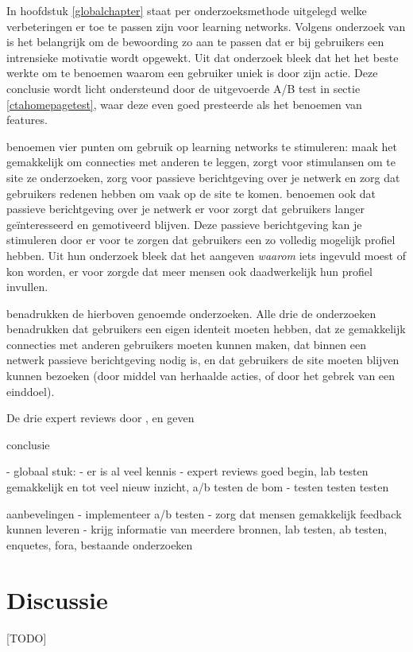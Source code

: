 \documentclass[a4paper, 10pt, pdftex]{report}
\begin{document}
    In hoofdstuk \ref{globalchapter} staat per onderzoeksmethode uitgelegd welke verbeteringen er toe te passen zijn voor learning networks. Volgens onderzoek van \citeauthor{Beenen2004} is het belangrijk om de bewoording zo aan te passen dat er bij gebruikers een intrensieke motivatie wordt opgewekt. Uit dat onderzoek bleek dat het het beste werkte om te benoemen waarom een gebruiker uniek is door zijn actie. Deze conclusie wordt licht ondersteund door de uitgevoerde A/B test in sectie \ref{ctahomepagetest}, waar deze even goed presteerde als het benoemen van features. 
    
    \citeauthor{Sohn2005} benoemen vier punten om gebruik op learning networks te stimuleren: maak het gemakkelijk om connecties met anderen te leggen, zorgt voor stimulansen om te site ze onderzoeken, zorg voor passieve berichtgeving over je netwerk en zorg dat gebruikers redenen hebben om vaak op de site te komen. \citeauthor{Brouns2008} benoemen ook dat passieve berichtgeving over je netwerk er voor zorgt dat gebruikers langer ge\"interesseerd en gemotiveerd blijven. Deze passieve berichtgeving kan je stimuleren door er voor te zorgen dat gebruikers een zo volledig mogelijk profiel hebben. Uit hun onderzoek bleek dat het aangeven \emph{waarom} iets ingevuld moest of kon worden, er voor zorgde dat meer mensen ook daadwerkelijk hun profiel invullen.
    
    \citeauthor{Sloep2009} benadrukken de hierboven genoemde onderzoeken. Alle drie de onderzoeken benadrukken dat gebruikers een eigen identeit moeten hebben, dat ze gemakkelijk connecties met anderen gebruikers moeten kunnen maken, dat binnen een netwerk passieve berichtgeving nodig is, en dat gebruikers de site moeten blijven kunnen bezoeken (door middel van herhaalde acties, of door het gebrek van een einddoel). 
    
    De drie expert reviews door \citeauthor{Alfrink2008}, \citeauthor{Hoekman2008} en \citeauthor{Timmerman2008} geven
        
conclusie

  - globaal stuk:
      - er is al veel kennis
      - expert reviews goed begin, lab testen gemakkelijk en tot veel nieuw inzicht, a/b testen de bom
      - testen testen testen

aanbevelingen
  - implementeer a/b testen
  - zorg dat mensen gemakkelijk feedback kunnen leveren
  - krijg informatie van meerdere bronnen, lab testen, ab testen, enquetes, fora, bestaande onderzoeken


  \newpage
  \chapter*{Discussie}
[TODO]
\end{document}
